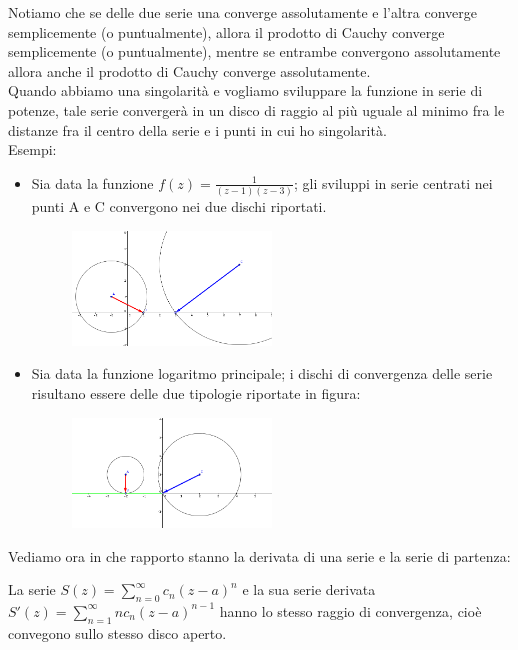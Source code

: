 Notiamo che se delle due serie una converge assolutamente e l'altra converge semplicemente (o puntualmente), allora il prodotto di Cauchy converge semplicemente (o puntualmente), mentre se entrambe convergono assolutamente allora anche il prodotto di Cauchy converge assolutamente.
\\
Quando abbiamo una singolarità e vogliamo sviluppare la funzione in serie di potenze, tale serie convergerà in un disco di raggio al più uguale al minimo fra le distanze fra il centro della serie e i punti in cui ho singolarità.
\\
Esempi:
\begin{itemize}
\item Sia data la funzione $f(z)=\frac{1}{(z-1)(z-3)}$; gli sviluppi in serie centrati nei punti A e C convergono nei due dischi riportati.
\begin{figure}[h!]
  \centering
    \includegraphics[width=0.5\textwidth]{immagini/frazione-polinomio-2.png}
\end{figure}
\item Sia data la funzione logaritmo principale; i dischi di convergenza delle serie risultano essere delle due tipologie riportate in figura:
\begin{figure}[h!]
  \centering
    \includegraphics[width=0.5\textwidth]{immagini/logaritmo-2.png}
\end{figure}
\end{itemize}
Vediamo ora in che rapporto stanno la derivata di una serie e la serie di partenza:
\begin{teorema}
La serie $S(z)=\sum_{n=0} ^{\infty} c_n (z-a)^n$ e la sua serie derivata $S'(z)=\sum_{n=1} ^{\infty} n c_n (z-a)^{n-1}$ hanno lo stesso raggio di convergenza, cioè convegono sullo stesso disco aperto.
\end{teorema}

